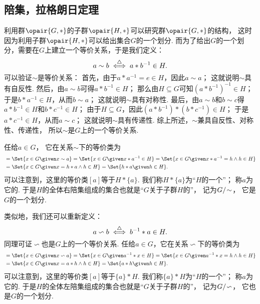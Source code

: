 \subsection{陪集，拉格朗日定理}
\begingroup
\def\RQuotient{G/\kern-2pt\sim}
\def\LQuotient{G/\kern-2pt\backsim}

利用群\(\opair{G,*}\)的子群\(\opair{H,*}\)可以研究群\(\opair{G,*}\)的结构，
这时因为利用子群\(\opair{H,*}\)可以给出集合\(G\)的一个划分.
而为了给出\(G\)的一个划分，需要在\(G\)上建立一个等价关系，于是我们定义：\begin{equation*}
	a \sim b
	\overset{\triangle}{\iff}
	a * b^{-1} \in H.
\end{equation*}
可以验证\(\sim\)是等价关系：
首先，由于\(a * a^{-1} = e \in H\)，因此\(a \sim a\)；
这就说明\(\sim\)具有自反性.
然后，由\(a \sim b\)可得\(a * b^{-1} \in H\)；
那么由\(H \subseteq G\)可知\((a * b^{-1})^{-1} \in H\)；
于是\(b * a^{-1} \in H\)，从而\(b \sim a\)；
这就说明\(\sim\)具有对称性.
最后，由\(a \sim b\)和\(b \sim c\)得\(a * b^{-1} \in H\)和\(b * c^{-1} \in H\)；
由于\(H \subseteq G\)，因此\((a * b^{-1}) * (b * c^{-1}) \in H\)；
于是\(a * c^{-1} \in H\)，从而\(a \sim c\)；
这就说明\(\sim\)具有传递性.
综上所述，\(\sim\)兼具自反性、对称性、传递性，
所以\(\sim\)是\(G\)上的一个等价关系.

任给\(a \in G\)，
它在关系\(\sim\)下的等价类为\begin{align*}
	[a] &= \Set{ x \in G \given x \sim a }
	= \Set{ x \in G \given x * a^{-1} \in H }
	= \Set{ x \in G \given x * a^{-1} = h \land h \in H } \\
	&= \Set{ x \in G \given x = h * a \land h \in H }
	= \Set{ h * a \given h \in H }.
\end{align*}
可以注意到，这里的等价类\([a]\)等于\(H * \{a\}\).
我们称\(H * \{a\}\)为“\(H\)的一个”；
称\(a\)为它的.
于是\(H\)的全体右陪集组成的集合也就是“\(G\)关于子群\(H\)的”，
记为\(\RQuotient\)，
它是\(G\)的一个划分.

类似地，我们还可以重新定义：\begin{equation*}
	a \backsim b
	\overset{\triangle}{\iff}
	b^{-1} * a \in H.
\end{equation*}
同理可证\(\backsim\)也是\(G\)上的一个等价关系.
任给\(a \in G\)，它在关系\(\backsim\)下的等价类为\begin{align*}
	[a] &= \Set{ x \in G \given x \backsim a }
	= \Set{ x \in G \given a^{-1} * x \in H }
	= \Set{ x \in G \given a^{-1} * x = h \land h \in H } \\
	&= \Set{ x \in G \given x = a * h \land h \in H }
	= \Set{ a * h \given h \in H }.
\end{align*}
可以注意到，这里的等价类\([a]\)等于\(\{a\} * H\).
我们称\(\{a\} * H\)为“\(H\)的一个”；
称\(a\)为它的.
于是\(H\)的全体左陪集组成的集合也就是“\(G\)关于子群\(H\)的”，
记为\(\LQuotient\)，
它也是\(G\)的一个划分.

